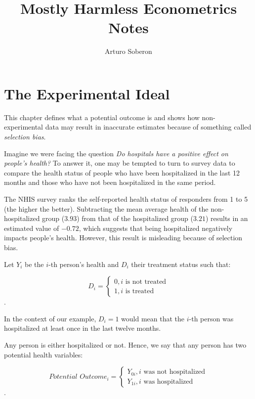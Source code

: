 \documentclass[12pt]{article}
\begin{document}
\title{Mostly Harmless Econometrics Notes}
\author{Arturo Soberon}
\maketitle

\setcounter{section}{1}
\section{The Experimental Ideal}
This chapter defines what a potential outcome is and shows how non-experimental
data may result in inaccurate estimates because of something called 
\textit{selection bias}.

Imagine we were facing the question \textit{Do hospitals have a positive
effect on people's health?} To answer it, one may be tempted to turn to survey
data to compare the health status of people who have been hospitalized in the
last 12 months and those who have not been hospitalized in the same period.

The NHIS survey ranks the self-reported health status of responders from 1 to 
5 (the higher the better). Subtracting the mean average health of the
non-hospitalized group ($3.93$) from that of the hospitalized group ($3.21$)
results in an estimated value of $-0.72$, which suggests that being
hospitalized negatively impacts people's health. However, this result is
misleading because of selection bias.

Let $Y_i$ be the $i$-th person's health and $D_i$ their treatment status such
that:

\begin{equation*}
    D_i = 
    \begin{cases}
        0, \text{$i$ is not treated} \\
        1, \text{$i$ is treated}
    \end{cases}
\end{equation*}.

In the context of our example, $D_i = 1$ would mean that the $i$-th person was
hospitalized at least once in the last twelve months.

Any person is either hospitalized or not. Hence, we say that any person has two
potential health variables:

\begin{equation*}
    \textit{Potential Outcome}_i = 
    \begin{cases}
        Y_{0i}, \text{$i$ was not hospitalized} \\
        Y_{1i}, \text{$i$ was hospitalized}
    \end{cases}
\end{equation*}.
\end{document}
